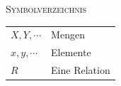 \documentclass[a4paper]{amsart}
\theoremstyle{definition}
\begin{document}
\begin{large}
    \centerline{\textsc{Symbolverzeichnis}}
\end{large}
\bigskip

\renewcommand*{\arraystretch}{1}

\begin{tabular}{ll}
    $X, Y, \cdots$          & Mengen\\
    $x, y, \cdots$             & Elemente\\
    $R$             & Eine Relation
   
\end{tabular}
\end{document}
